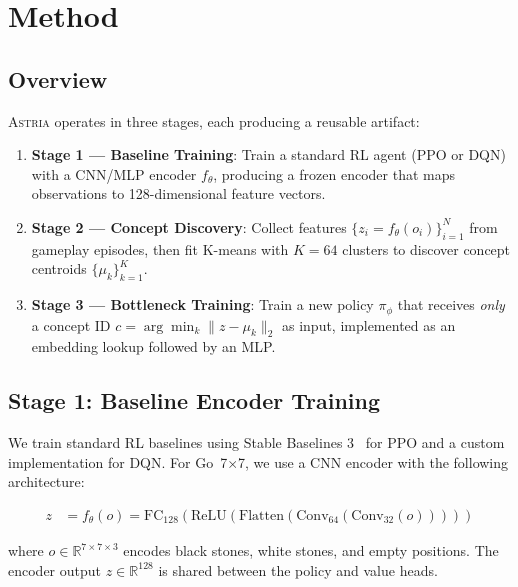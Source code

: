 \documentclass[11pt,a4paper]{article}
\newcommand{\astria}{\textsc{Astria}}
\newcommand{\encoder}{f_\theta}
\newcommand{\policy}{\pi_\phi}
\begin{document}
\section{Method}

\subsection{Overview}

\astria{} operates in three stages, each producing a reusable artifact:

\begin{enumerate}[leftmargin=*]
    \item \textbf{Stage 1 --- Baseline Training}: Train a standard RL agent (PPO or DQN) with a CNN/MLP encoder $\encoder$, producing a frozen encoder that maps observations to 128-dimensional feature vectors.
    \item \textbf{Stage 2 --- Concept Discovery}: Collect features $\{z_i = \encoder(o_i)\}_{i=1}^N$ from gameplay episodes, then fit K-means with $K=64$ clusters to discover concept centroids $\{\mu_k\}_{k=1}^K$.
    \item \textbf{Stage 3 --- Bottleneck Training}: Train a new policy $\policy$ that receives \emph{only} a concept ID $c = \arg\min_k \|z - \mu_k\|_2$ as input, implemented as an embedding lookup followed by an MLP.
\end{enumerate}

\subsection{Stage 1: Baseline Encoder Training}

We train standard RL baselines using Stable Baselines 3~\citep{raffin2021stable} for PPO and a custom implementation for DQN. For Go~7$\times$7, we use a CNN encoder with the following architecture:

\begin{align}
    z &= \encoder(o) = \text{FC}_{128}(\text{ReLU}(\text{Flatten}(\text{Conv}_{64}(\text{Conv}_{32}(o))))) \label{eq:encoder}
\end{align}

where $o \in \mathbb{R}^{7 \times 7 \times 3}$ encodes black stones, white stones, and empty positions. The encoder output $z \in \mathbb{R}^{128}$ is shared between the policy and value heads.
\end{document}
